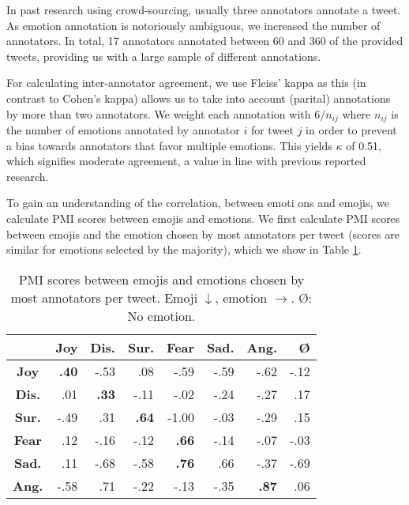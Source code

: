 \documentclass[10pt, a4paper]{article}
\begin{document}
In past research using crowd-sourcing, usually three annotators annotate a tweet. As emotion annotation is notoriously ambiguous, we increased the number of annotators. In total, 17 annotators annotated between 60 and 360 of the provided tweets, providing us with a large sample of different annotations.

For calculating inter-annotator agreement, we use Fleiss' kappa as this (in contrast to Cohen's kappa) allows us to take into account (parital) annotations by more than two annotators. We weight each annotation with $ 6 / n_{ij}$ where $n_{ij}$ is the number of emotions annotated by annotator $i$ for tweet $j$ in order to prevent a bias towards annotators that favor multiple emotions. This yields $\kappa$ of 0.51, which signifies moderate agreement, a value in line with previous reported research.

To gain an understanding of the correlation, between emoti%
%
%
ons and emojis, we calculate PMI scores between emojis and emotions. We first calculate PMI scores between emojis and the emotion chosen by most annotators per tweet (scores are similar for emotions selected by the majority), which we show in Table \ref{tab:pmi_results_top_emotions}.

\begin{table}[!ht]
\centering
\begin{tabular}{c | r | r | r | r%
%
%
 | r | r | r}
 & \textbf{Joy} & \textbf{Dis.} & \textbf{Sur.} & \textbf{Fear} & \textbf{Sad.} & \textbf{Ang.} & \textbf{\O} \\\hline
\textbf{Joy} & \textbf{.40} & -.53 & .08 & -.59 & -.59 & -.62 & -.12 \\
\textbf{Dis.} & .01 & \textbf{.33} & -.11 & -.02 & -.24 & -.27 & .17 \\
\textbf{Sur.} & -.49 & .31 & \textbf{.64} & -1.00 & -.03 & -.29 & .15 \\
\textbf{Fear} & .12 & -.16 & -.12 & \textbf{.66} & -.14 & -.07 & -.03 \\
\textbf{Sad.} & .11 & -.68 & -.58 & \textbf{.76} & .66 & -.37 & -.69 \\
\textbf{Ang.} & -.58 & .71 & -.22 & -.13 & -.35 & \textbf{.87} & .06
\end{tabular}
\caption{PMI scores between emojis and emotions chosen by most annotators per tweet. Emoji $\downarrow$, emotion $\rightarrow$. \O: No emotion.}
\label{tab:pmi_results_top_emotions}
\end{table}
\end{document}
